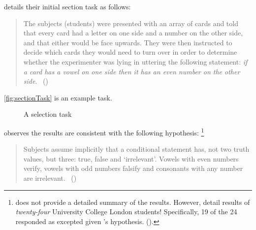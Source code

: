 \begin{note}
  \citeauthor{Wason:1966aa} details their initial section task as follows:
  \begin{quote}
    The subjects (students) were presented with an array of cards and told that every card had a letter on one side and a number on the other side, and that either would be face upwards.
    They were then instructed to decide which cards they would need to turn over in order to determine whether the experimenter was lying in uttering the following statement:
    \emph{if a card has a vowel on one side then it has an even number on the other side}.%
    \mbox{ }\hfill\mbox{(\citeyear[145--146]{Wason:1966aa})}
  \end{quote}
  \autoref{fig:sectionTask} is an example task.
  \begin{figure}[H]
    \centering
    \caption{A selection task}
    \label{fig:sectionTask}
  \end{figure}

  \citeauthor{Wason:1966aa} observes the results are consistent with the following hypothesis:%
  \footnote{
    \citeauthor{Wason:1966aa} does not provide a detailed summary of the results.
    However, \citeauthor{Johnson-Laird:1969aa} detail results of \emph{twenty-four} University College London students!
    Specifically, 19 of the 24 responded as excepted given \citeauthor{Wason:1966aa}'s hypothesis.
    (\citeyear[369--370]{Johnson-Laird:1969aa}).
  }
  \begin{quote}
    Subjects assume implicitly that a conditional statement has, not two truth values, but three: true, false and `irrelevant'.
    Vowels with even numbers verify, vowels with odd numbers falsify and consonants with any number are irrelevant.%
    \mbox{ }\hfill\mbox{(\citeyear[146]{Wason:1966aa})}
  \end{quote}
\end{note}


